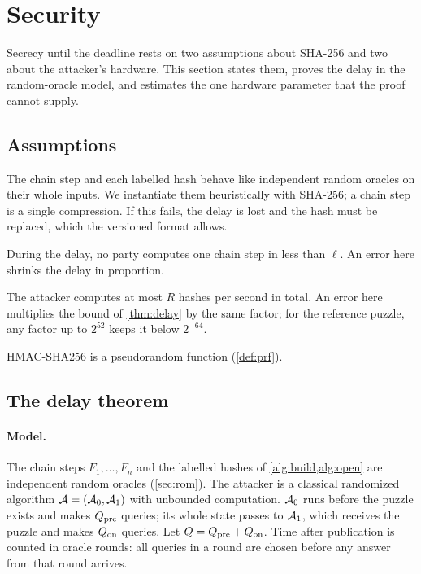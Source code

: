 \section{Security}\label{sec:security}

Secrecy until the deadline rests on two assumptions about SHA-256 and two about the attacker's hardware. This section states them, proves the delay in the random-oracle model, and estimates the one hardware parameter that the proof cannot supply.

\subsection{Assumptions}\label{sec:assumptions}

\begin{description}[leftmargin=1.5em,font=\normalfont\bfseries]
  \item[A1. No shortcut.] The chain step and each labelled hash behave like independent random oracles on their whole inputs. We instantiate them heuristically with SHA-256; a chain step is a single compression. If this fails, the delay is lost and the hash must be replaced, which the versioned format allows.
  \item[A2. Speed.] During the delay, no party computes one chain step in less than $\ell$. An error here shrinks the delay in proportion.
  \item[A3. Budget.] The attacker computes at most $R$ hashes per second in total. An error here multiplies the bound of \cref{thm:delay} by the same factor; for the reference puzzle, any factor up to $2^{52}$ keeps it below $2^{-64}$.
  \item[A4. Encryption.] HMAC-SHA256 is a pseudorandom function (\cref{def:prf}).
\end{description}

\subsection{The delay theorem}\label{sec:theorem}

\paragraph{Model.}
The chain steps $F_1, \dots, F_n$ and the labelled hashes of \cref{alg:build,alg:open} are independent random oracles (\cref{sec:rom}). The attacker is a classical randomized algorithm $\mathcal{A} = (\mathcal{A}_0, \mathcal{A}_1)$ with unbounded computation. $\mathcal{A}_0$ runs before the puzzle exists and makes $Q_{\mathrm{pre}}$ queries; its whole state passes to $\mathcal{A}_1$, which receives the puzzle and makes $Q_{\mathrm{on}}$ queries. Let $Q = Q_{\mathrm{pre}} + Q_{\mathrm{on}}$. Time after publication is counted in oracle rounds: all queries in a round are chosen before any answer from that round arrives.

